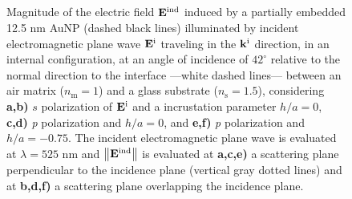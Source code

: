 \begin{figure}[t!]\centering
   \def\svgwidth{.75\textwidth}
   \footnotesize
   \\[-47.25em]
   \hspace*{-.25\textwidth}
       \begin{subfigure}{.25\textwidth}\caption{ } \label{sfig:Near:Inc0:42:s1}\end{subfigure}%
       \begin{subfigure}{.34\textwidth}\caption{ }\label{sfig:Near:Inc0:42:s2}\end{subfigure}\\[13em]
   \hspace*{-.25\textwidth}
       \begin{subfigure}{.25\textwidth}\caption{ } \label{sfig:Near:Inc0:42:p1}\end{subfigure}%
       \begin{subfigure}{.34\textwidth}\caption{ }\label{sfig:Near:Inc0:42:p2}\end{subfigure}\\[13em]
    \hspace*{-.25\textwidth}
       \begin{subfigure}{.25\textwidth}\caption{ } \label{sfig:Near:Inc-75:42:p1}\end{subfigure}%
       \begin{subfigure}{.34\textwidth}\caption{ }\label{sfig:Near:Inc-75:42:p2}\end{subfigure}\\[15em]
   \caption[Induced Electric Field of a 12.5 nm Au NP on substrate illuminated at oblique incidence with a $s$ polarized electric field]{%
   Magnitude of the electric field $\vb{E}^\text{ind}$ induced by a partially embedded 12.5 nm AuNP (dashed black lines)  illuminated by incident electromagnetic plane wave $\vb{E}^\text{i}$ traveling in the $\vb{k}^\text{i}$ direction, in an internal configuration, at an angle of incidence of  $42^\circ$ relative to the normal direction to the interface ---white dashed lines--- between an air matrix ($n_\text{m} = 1$) and a glass substrate ($n_\text{s} = 1.5$), considering \textbf{a,b)} $s$ polarization of $\vb{E}^\text{i}$ and a incrustation parameter $h/a=0$, \textbf{c,d)} \textit{p} polarization and $h/a=0$, and \textbf{e,f)}  \textit{p} polarization and $h/a=-0.75$. The incident electromagnetic plane wave is evaluated at $\lambda = 525$ nm and  $\norm{\vb{E}^\text{ind}}$ is evaluated at  \textbf{a,c,e)} a scattering plane perpendicular to the incidence plane (vertical gray dotted lines) and at \textbf{b,d,f)} a scattering plane overlapping the incidence plane. }
   \label{fig:Near:Inc:Obl}
 \end{figure}

